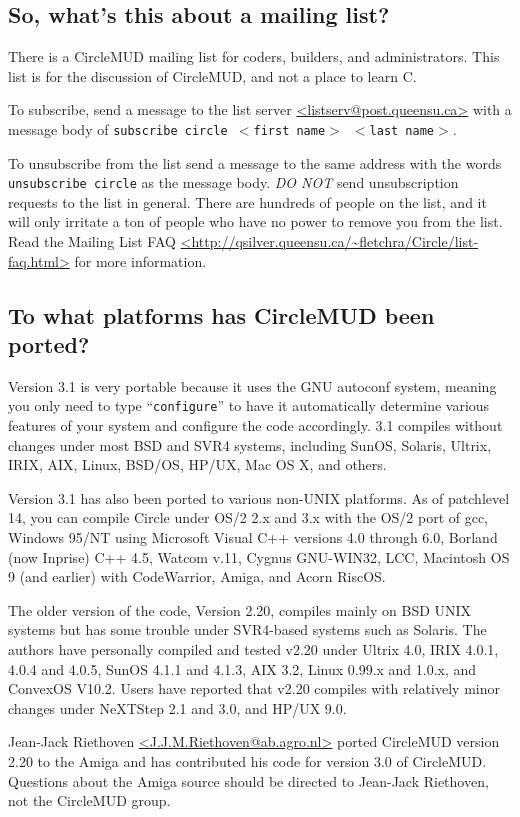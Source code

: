 \documentclass[11pt]{article}
\begin{document}
\subsection{So, what's this about a mailing list?}\label{mailinglist}
There is a CircleMUD mailing list for coders, builders, and administrators.  This list is for the discussion of CircleMUD, and not a place to learn C.
\par
To subscribe, send a message to the list server \url{<listserv@post.queensu.ca>} with a message body of \texttt{subscribe circle $<$first name$>$ $<$last name$>$}.
\par
To unsubscribe from the list send a message to the same address with the words \texttt{unsubscribe circle} as the message body. {\em DO NOT} send unsubscription requests to the list in general.  There are hundreds of people on the list, and it will only irritate a ton of people who have no power to remove you from the list.  Read the Mailing List FAQ \url{<http://qsilver.queensu.ca/~fletchra/Circle/list-faq.html>} for more information.

\subsection{To what platforms has CircleMUD been ported?}
Version 3.1 is very portable because it uses the GNU autoconf system, meaning you only need to type ``\texttt{configure}'' to have it automatically determine various features of your system and configure the code accordingly. 3.1 compiles without changes under most BSD and SVR4 systems, including SunOS, Solaris, Ultrix, IRIX, AIX, Linux, BSD/OS, HP/UX, Mac OS X, and others.
\par
Version 3.1 has also been ported to various non-UNIX platforms.  As of patchlevel 14, you can compile Circle under OS/2 2.x and 3.x with the OS/2 port of gcc, Windows 95/NT using Microsoft Visual C++ versions 4.0 through 6.0, Borland (now Inprise) C++ 4.5, Watcom v.11, Cygnus GNU-WIN32, LCC, Macintosh OS 9 (and earlier) with CodeWarrior, Amiga, and Acorn RiscOS.
\par
The older version of the code, Version 2.20, compiles mainly on BSD UNIX systems but has some trouble under SVR4-based systems such as Solaris.  The authors have personally compiled and tested v2.20 under Ultrix 4.0, IRIX 4.0.1, 4.0.4 and 4.0.5, SunOS 4.1.1 and 4.1.3, AIX 3.2, Linux 0.99.x and 1.0.x, and ConvexOS V10.2.  Users have reported that v2.20 compiles with relatively minor changes under NeXTStep 2.1 and 3.0, and HP/UX 9.0.
\par
Jean-Jack Riethoven \url{<J.J.M.Riethoven@ab.agro.nl>} ported CircleMUD version 2.20 to the Amiga and has contributed his code for version 3.0 of CircleMUD.  Questions about the Amiga source should be directed to Jean-Jack Riethoven, not the CircleMUD group.
\end{document}
